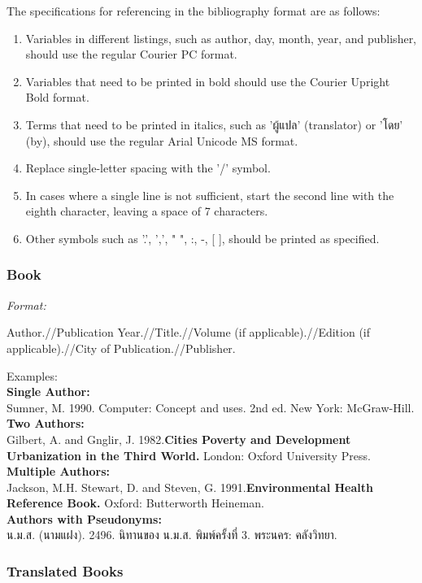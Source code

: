 The specifications for referencing in the bibliography format are as follows:
\begin{enumerate}
    \item Variables in different listings, such as author, day, month, year, and publisher, should use the regular Courier PC format.
    \item Variables that need to be printed in bold should use the Courier Upright Bold format.
    \item Terms that need to be printed in italics, such as 'ผู้แปล' (translator) or 'โดย' (by), should use the regular Arial Unicode MS format.
    \item Replace single-letter spacing with the '/' symbol.
    \item In cases where a single line is not sufficient, start the second line with the eighth character, leaving a space of 7 characters.
    \item Other symbols such as '.', ',', " ", :, -, [ ], should be printed as specified.
\end{enumerate}

\subsubsection{Book}

\textit{Format:}

Author.//Publication Year.//Title.//Volume (if applicable).//Edition (if applicable).//City of Publication.//Publisher.

Examples:\\
\textbf{Single Author:}\\
Sumner, M. 1990. Computer: Concept and uses. 2nd ed. New York: McGraw-Hill.\\
\textbf{Two Authors:}\\
Gilbert, A. and Gnglir, J. 1982.\textbf{Cities Poverty and Development Urbanization in the Third World.} London: Oxford University Press.\\
\textbf{Multiple Authors:}\\
Jackson, M.H. Stewart, D. and Steven, G. 1991.\textbf{Environmental Health Reference Book.} Oxford: Butterworth Heineman.\\
\textbf{Authors with Pseudonyms:}\\
น.ม.ส. (นามแฝง). 2496. นิทานของ น.ม.ส. พิมพ์ครั้งที่ 3. พระนคร: คลังวิทยา.

\subsubsection{Translated Books}

